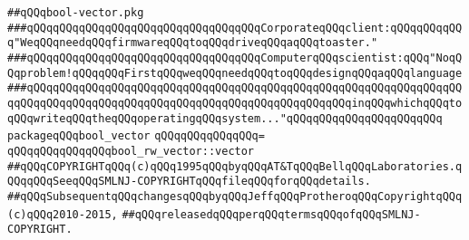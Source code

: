 \label{src/lib/src/bool-vector.pkg}
\verb|##qQQqbool-vector.pkg|\newline
\newline
\newline
\newline
\verb|###qQQqqQQqqQQqqQQqqQQqqQQqqQQqqQQqqQQqCorporateqQQqclient:qQQqqQQqqQQq"WeqQQqneedqQQqfirmwareqQQqtoqQQqdriveqQQqaqQQqtoaster."|\newline
\verb|###qQQqqQQqqQQqqQQqqQQqqQQqqQQqqQQqqQQqComputerqQQqscientist:qQQq"NoqQQqproblem!qQQqqQQqFirstqQQqweqQQqneedqQQqtoqQQqdesignqQQqaqQQqlanguage|\newline
\verb|###qQQqqQQqqQQqqQQqqQQqqQQqqQQqqQQqqQQqqQQqqQQqqQQqqQQqqQQqqQQqqQQqqQQqqQQqqQQqqQQqqQQqqQQqqQQqqQQqqQQqqQQqqQQqqQQqqQQqqQQqinqQQqwhichqQQqtoqQQqwriteqQQqtheqQQqoperatingqQQqsystem..."qQQqqQQqqQQqqQQqqQQqqQQq|\newline
\newline
\newline
\newline
\verb|packageqQQqbool_vector|\newline
\verb|qQQqqQQqqQQqqQQq=|\newline
\verb|qQQqqQQqqQQqqQQqbool_rw_vector::vector|\newline
\newline
\newline
\verb|##qQQqCOPYRIGHTqQQq(c)qQQq1995qQQqbyqQQqAT&TqQQqBellqQQqLaboratories.qQQqqQQqSeeqQQqSMLNJ-COPYRIGHTqQQqfileqQQqforqQQqdetails.|\newline
\verb|##qQQqSubsequentqQQqchangesqQQqbyqQQqJeffqQQqProtheroqQQqCopyrightqQQq(c)qQQq2010-2015,|\newline
\verb|##qQQqreleasedqQQqperqQQqtermsqQQqofqQQqSMLNJ-COPYRIGHT.|\newline

